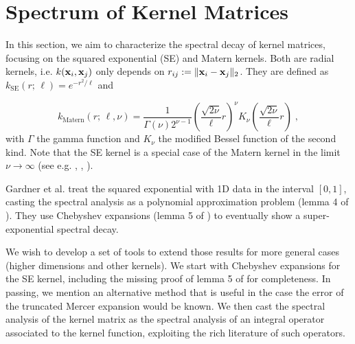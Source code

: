 \documentclass{article}
\begin{document}
\section{Spectrum of Kernel Matrices} \label{sec:spectrum}

In this section, we aim to characterize the spectral decay of kernel matrices, focusing on the squared exponential (SE) and Matern kernels. 
Both are radial kernels, i.e. $k(\boldsymbol{\mathbf{x}}_i, \boldsymbol{\mathbf{x}}_j)$ only depends on $r_{ij} := \Vert \boldsymbol{\mathbf{x}}_i -  \boldsymbol{\mathbf{x}}_j \Vert_2$. They are defined as $k_\text{SE}(r; \, \ell) = e^{-r^2 / \ell}$ and

\begin{equation*}
    k_{\text{Matern}}(r ; \, \ell, \nu) = \frac{1}{\Gamma(\nu) 2^{\nu - 1}} \left( \frac{\sqrt{2\nu}}{\ell} r \right)^\nu K_\nu \left( \frac{\sqrt{2\nu}}{\ell} r \right) \; ,
\end{equation*}
%
with $\Gamma$ the gamma function and $K_\nu$ the modified Bessel function of the second kind. Note that the SE kernel is a special case of the Matern kernel in the limit $\nu\to\infty$ (see e.g. \cite{borovitskiy_matern_nodate}, \cite{genton_classes_2002}, \cite{rasmussen_gaussian_2005}).

Gardner et al. \cite{gardner_gpytorch_2021} treat the squared exponential with 1D data in the interval $[0, 1]$, casting the spectral analysis as a polynomial approximation problem (lemma 4 of \cite{gardner_gpytorch_2021}). They use Chebyshev expansions (lemma 5 of \cite{gardner_gpytorch_2021}) to eventually show a super-exponential spectral decay. 

We wish to develop a set of tools to extend those results for more general cases (higher dimensions and other kernels). 
We start with Chebyshev expansions for the SE kernel, including the missing proof of lemma 5 of \cite{gardner_gpytorch_2021} for completeness.  
In passing, we mention an alternative method that is useful in the case the error of the truncated Mercer expansion would be known.
We then cast the spectral analysis of the kernel matrix as the spectral analysis of an integral operator associated to the kernel function, exploiting the rich literature of such operators. 
\end{document}
